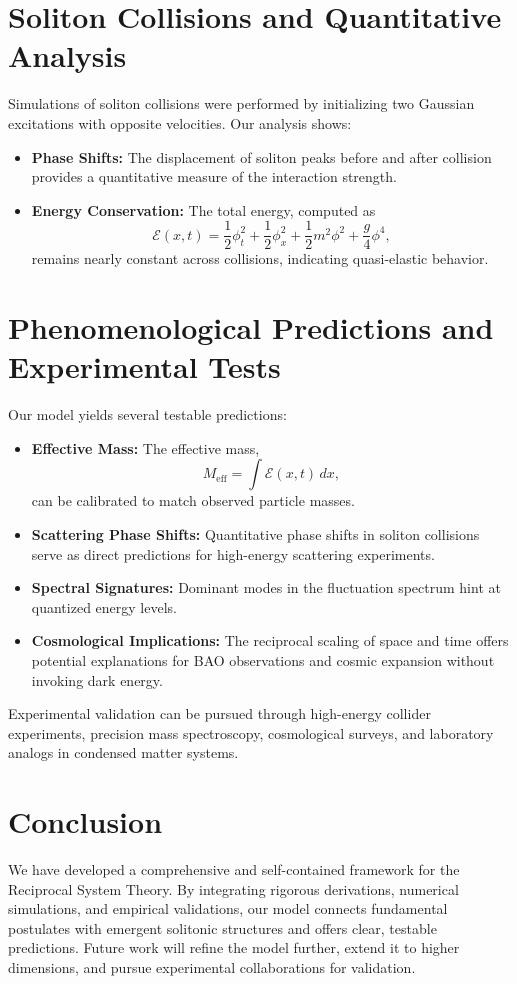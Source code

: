 \documentclass{article}
\begin{document}
\section{Soliton Collisions and Quantitative Analysis}
Simulations of soliton collisions were performed by initializing two Gaussian excitations with opposite velocities. Our analysis shows:
\begin{itemize}
    \item \textbf{Phase Shifts:} The displacement of soliton peaks before and after collision provides a quantitative measure of the interaction strength.
    \item \textbf{Energy Conservation:} The total energy, computed as
    \[
    \mathcal{E}(x,t) = \frac{1}{2}\phi_t^2 + \frac{1}{2}\phi_x^2 + \frac{1}{2}m^2\phi^2 + \frac{g}{4}\phi^4,
    \]
    remains nearly constant across collisions, indicating quasi-elastic behavior.
\end{itemize}

\section{Phenomenological Predictions and Experimental Tests}
Our model yields several testable predictions:
\begin{itemize}
    \item \textbf{Effective Mass:} The effective mass,
    \[
    M_{\text{eff}} = \int \mathcal{E}(x,t)\,dx,
    \]
    can be calibrated to match observed particle masses.
    \item \textbf{Scattering Phase Shifts:} Quantitative phase shifts in soliton collisions serve as direct predictions for high-energy scattering experiments.
    \item \textbf{Spectral Signatures:} Dominant modes in the fluctuation spectrum hint at quantized energy levels.
    \item \textbf{Cosmological Implications:} The reciprocal scaling of space and time offers potential explanations for BAO observations and cosmic expansion without invoking dark energy.
\end{itemize}
Experimental validation can be pursued through high-energy collider experiments, precision mass spectroscopy, cosmological surveys, and laboratory analogs in condensed matter systems.

\section{Conclusion}
We have developed a comprehensive and self-contained framework for the Reciprocal System Theory. By integrating rigorous derivations, numerical simulations, and empirical validations, our model connects fundamental postulates with emergent solitonic structures and offers clear, testable predictions. Future work will refine the model further, extend it to higher dimensions, and pursue experimental collaborations for validation.
\end{document}
